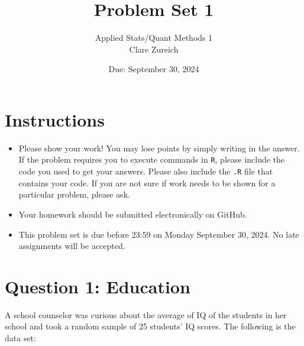 \documentclass[12pt,letterpaper]{article}
\title{Problem Set 1}
\date{Due: September 30, 2024}
\author{Applied Stats/Quant Methods 1 \\ Clare Zureich}
\begin{document}
	\maketitle
	
	\section*{Instructions}
	\begin{itemize}
	\item Please show your work! You may lose points by simply writing in the answer. If the problem requires you to execute commands in \texttt{R}, please include the code you used to get your answers. Please also include the \texttt{.R} file that contains your code. If you are not sure if work needs to be shown for a particular problem, please ask.
\item Your homework should be submitted electronically on GitHub.
\item This problem set is due before 23:59 on Monday September 30, 2024. No late assignments will be accepted.
	\end{itemize}
	
	\vspace{1cm}
	\section*{Question 1: Education}

A school counselor was curious about the average of IQ of the students in her school and took a random sample of 25 students' IQ scores. The following is the data set:\\
\vspace{.5cm}

  

\vspace{1cm}
\end{document}
